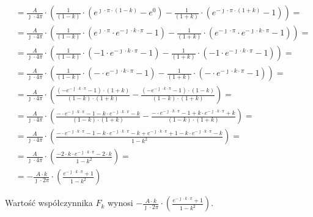\begin{task}
\begin{align*}
&=\frac{A}{\jmath \cdot 4\pi} \cdot \left( \frac{1}{\left(1 -k\right)} \cdot \left(e^{\jmath \cdot \pi \cdot \left(1 -k\right) } -e^{0}\right) - \frac{1}{ \left(1+k\right)}\cdot \left( e^{-\jmath \cdot \pi \cdot \left(1+k\right) } - 1\right) \right)=\\
&=\frac{A}{\jmath \cdot 4\pi} \cdot \left( \frac{1}{\left(1 -k\right)} \cdot \left(e^{\jmath \cdot \pi } \cdot e^{-\jmath \cdot k \cdot \pi}  -1\right) - \frac{1}{ \left(1+k\right)}\cdot \left( e^{-\jmath \cdot \pi } \cdot e^{-\jmath \cdot k \cdot \pi } - 1\right) \right)=\\
&=\frac{A}{\jmath \cdot 4\pi} \cdot \left( \frac{1}{\left(1 -k\right)} \cdot \left(-1 \cdot e^{-\jmath \cdot k \cdot \pi}  -1\right) - \frac{1}{ \left(1+k\right)}\cdot \left( -1 \cdot e^{-\jmath \cdot k \cdot \pi } - 1\right) \right)=\\
&=\frac{A}{\jmath \cdot 4\pi} \cdot \left( \frac{1}{\left(1 -k\right)} \cdot \left(- \cdot e^{-\jmath \cdot k \cdot \pi}  -1\right) - \frac{1}{ \left(1+k\right)}\cdot \left( - \cdot e^{-\jmath \cdot k \cdot \pi } - 1\right) \right)=\\
&=\frac{A}{\jmath \cdot 4\pi} \cdot \left( \frac{\left(- e^{-\jmath \cdot k \cdot \pi}  -1\right) \cdot \left(1+k\right) }{\left(1 -k\right) \cdot \left(1+k\right)} - \frac{\left( - e^{-\jmath \cdot k \cdot \pi } - 1\right)  \cdot \left(1 -k\right)}{\left(1 -k\right) \cdot \left(1+k\right)} \right)=\\
&=\frac{A}{\jmath \cdot 4\pi} \cdot \left( \frac{- \cdot e^{-\jmath \cdot k \cdot \pi}  -1 - k \cdot e^{-\jmath \cdot k \cdot \pi}  -k }{\left(1 -k\right) \cdot \left(1+k\right)} - \frac{ - \cdot e^{-\jmath \cdot k \cdot \pi } - 1 +k \cdot e^{-\jmath \cdot k \cdot \pi } +k }{\left(1 -k\right) \cdot \left(1+k\right)} \right)=\\
&=\frac{A}{\jmath \cdot 4\pi} \cdot \left( \frac{- \cdot e^{-\jmath \cdot k \cdot \pi}  -1 - k \cdot e^{-\jmath \cdot k \cdot \pi}  -k + e^{-\jmath \cdot k \cdot \pi } + 1 -k \cdot e^{-\jmath \cdot k \cdot \pi } -k }{1 -k^2} \right)=\\
&=\frac{A}{\jmath \cdot 4\pi} \cdot \left( \frac{ - 2\cdot k \cdot e^{-\jmath \cdot k \cdot \pi}  -2\cdot k}{1 -k^2} \right)=\\
&=-\frac{A \cdot k}{\jmath \cdot 2\pi} \cdot \left( \frac{ e^{-\jmath \cdot k \cdot \pi}  + 1}{1 -k^2} \right)
\end{align*}

Wartość współczynnika $F_k$ wynosi $-\frac{A \cdot k}{\jmath \cdot 2\pi} \cdot \left( \frac{ e^{-\jmath \cdot k \cdot \pi}  + 1}{1 -k^2} \right)$.


\end{task}
